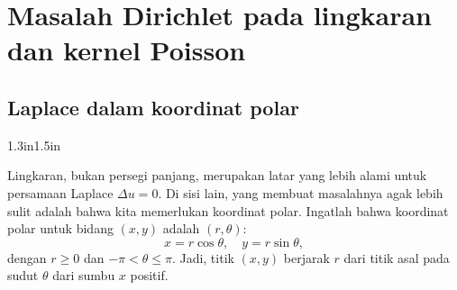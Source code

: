 %


\sectionnewpage
\section{Masalah Dirichlet pada lingkaran dan kernel Poisson}
\label{dirichdisc:section}



\subsection{Laplace dalam koordinat polar}

\begin{mywrapfigsimp}[5]{1.3in}{1.5in}
\diffypdfversion{\vspace*{5pt}}
\noindent
{}
\diffypdfversion{\vspace*{5pt}}
\end{mywrapfigsimp}
Lingkaran, bukan persegi panjang, merupakan latar yang lebih alami untuk persamaan Laplace $\Delta u = 0$.
Di sisi lain, yang membuat
masalahnya agak lebih sulit adalah bahwa kita memerlukan koordinat polar.
Ingatlah bahwa koordinat polar untuk bidang $(x,y)$ adalah $(r,\theta)$: 
\begin{equation*}
x = r \cos \theta , \quad y = r \sin \theta ,
\end{equation*}
dengan $r \geq 0$ dan $-\pi < \theta \leq \pi$.  Jadi, titik $(x,y)$ berjarak
$r$ dari titik asal pada sudut $\theta$ dari
sumbu $x$ positif.

